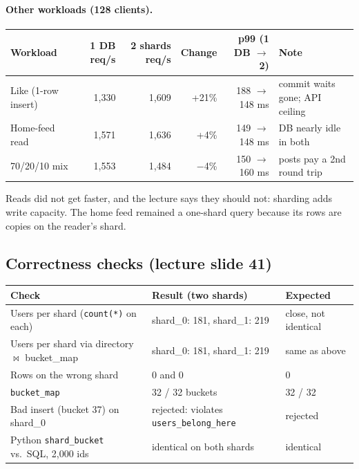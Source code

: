 \paragraph{Other workloads (128 clients).}
\begin{center}\footnotesize
\begin{tabular}{@{}lrrrrl@{}}
\toprule
Workload & 1 DB req/s & 2 shards req/s & Change & p99 (1 DB $\to$ 2) & Note \\
\midrule
Like (1-row insert) & 1{,}330 & 1{,}609 & +21\% & 188 $\to$ 148 ms & commit waits gone; API ceiling \\
Home-feed read & 1{,}571 & 1{,}636 & +4\% & 149 $\to$ 148 ms & DB nearly idle in both \\
70/20/10 mix & 1{,}553 & 1{,}484 & $-$4\% & 150 $\to$ 160 ms & posts pay a 2nd round trip \\
\bottomrule
\end{tabular}
\end{center}
Reads did not get faster, and the lecture says they should not: sharding adds write capacity. The home feed remained a
one-shard query because its rows are copies on the reader's shard.

\subsection{Correctness checks (lecture slide 41)}
\begin{center}\small
\begin{tabular}{@{}lll@{}}
\toprule
Check & Result (two shards) & Expected \\
\midrule
Users per shard (\texttt{count(*)} on each) & shard\_0: 181, shard\_1: 219 & close, not identical \\
Users per shard via directory $\bowtie$ bucket\_map & shard\_0: 181, shard\_1: 219 & same as above \\
Rows on the wrong shard & 0 and 0 & 0 \\
\texttt{bucket\_map} & 32 / 32 buckets & 32 / 32 \\
Bad insert (bucket 37) on shard\_0 & rejected: violates \texttt{users\_belong\_here} & rejected \\
Python \texttt{shard\_bucket} vs.\ SQL, 2{,}000 ids & identical on both shards & identical \\
\bottomrule
\end{tabular}
\end{center}

